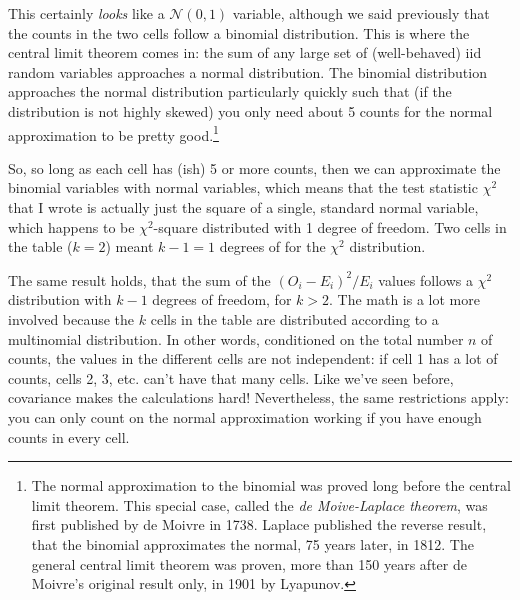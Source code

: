 \documentclass{book}
\begin{document}
This certainly \emph{looks} like a $\mathcal{N}(0, 1)$ variable, although we
said previously that the counts in the two cells follow a binomial
distribution. This is where the central limit theorem comes in: the sum of any
large set of (well-behaved) iid random variables approaches a normal
distribution. The binomial distribution approaches the normal distribution
particularly quickly such that (if the distribution is not highly skewed) you
only need about 5 counts for the normal approximation to be pretty
good.\footnote{The normal approximation to the binomial was proved long before
the central limit theorem. This special case, called the \emph{de Moive-Laplace
theorem}, was first published by de Moivre in 1738. Laplace published
the reverse result, that the binomial approximates the normal, 75 years later,
in 1812. The general central limit theorem was proven, more than 150 years
after de Moivre's original result only, in 1901 by Lyapunov.}

So, so long as each cell has (ish) 5 or more counts, then we can approximate
the binomial variables with normal variables, which means that the test
statistic $\chi^2$ that I wrote is actually just the square of a single,
standard normal variable, which happens to be $\chi^2$-square distributed with
1 degree of freedom. Two cells in the table ($k=2$) meant $k-1=1$ degrees of
for the $\chi^2$ distribution.

The same result holds, that the sum of the $(O_i - E_i)^2/E_i$ values follows
a $\chi^2$ distribution with $k-1$ degrees of freedom, for $k>2$. The math is
a lot more involved because the $k$ cells in the table are distributed
according to a multinomial distribution. In other words, conditioned on the
total number $n$ of counts, the values in the different cells are not
independent: if cell 1 has a lot of counts, cells 2, 3, etc. can't have that
many cells. Like we've seen before, covariance makes the calculations hard!
Nevertheless, the same restrictions apply: you can only count on the normal
approximation working if you have enough counts in every cell.
\end{document}
